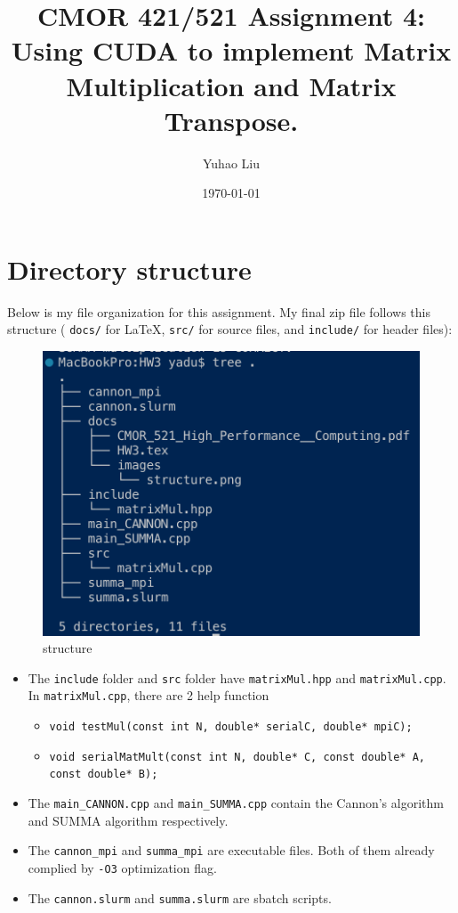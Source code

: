 \documentclass[11pt]{article}
\title{CMOR 421/521 Assignment 4: Using CUDA to implement Matrix Multiplication and Matrix Transpose.}
\author{Yuhao Liu}
\date{\today}
\begin{document}
\maketitle

\tableofcontents
\bigskip

\newpage

\section{Directory structure}
Below is my file organization for this assignment. 
My final zip file follows this structure ( \texttt{docs/} for LaTeX, \texttt{src/} for source files, and \texttt{include/} for header files):

\begin{figure}[H]
    \centering
    \includegraphics[width=0.5\linewidth]{Assignments/HW3/docs/images/structure.png}
    \caption{structure}
    \label{fig:structure}
\end{figure}

\begin{itemize}
    \item The \verb|include| folder and \verb|src| folder have \verb|matrixMul.hpp| and \verb|matrixMul.cpp|. In \verb|matrixMul.cpp|, there are 2 help function 
    \begin{itemize}
        \item \texttt{void testMul(const int N, double* serialC, double* mpiC);}  
    
        \item \texttt{void serialMatMult(const int N, double* C, const double* A, const double* B);}  
    \end{itemize}

    \item The \verb|main_CANNON.cpp| and \verb|main_SUMMA.cpp| contain the Cannon's algorithm and SUMMA algorithm respectively.
    \item The \verb|cannon_mpi| and \verb|summa_mpi| are executable files. Both of them already complied by \verb|-O3| optimization flag.
    \item The \verb|cannon.slurm| and \verb|summa.slurm| are sbatch scripts.
\end{itemize}
\end{document}
